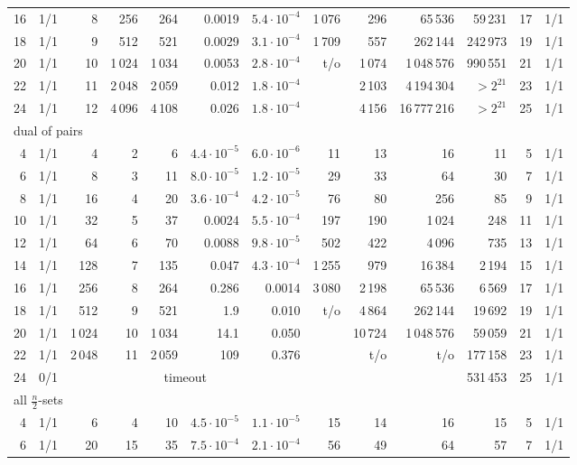\begin{table}[p]
\begin{tabular}{r r r r r r r r r r r r r}
16 & 1/1 & 8 & 256 & 264 & 0.0019 & $5.4{\cdot}10^{-4}$ & 1\,076 & 296 & 65\,536 & 59\,231 & 17 & 1/1\\
18 & 1/1 & 9 & 512 & 521 & 0.0029 & $3.1{\cdot}10^{-4}$ & 1\,709 & 557 & 262\,144 & 242\,973 & 19 & 1/1\\
20 & 1/1 & 10 & 1\,024 & 1\,034 & 0.0053 & $2.8{\cdot}10^{-4}$ & t/o & 1\,074 & 1\,048\,576 & 990\,551 & 21 & 1/1\\
22 & 1/1 & 11 & 2\,048 & 2\,059 & 0.012 & $1.8{\cdot}10^{-4}$ &  & 2\,103 & 4\,194\,304 & $>2^{21}$ & 23 & 1/1\\
24 & 1/1 & 12 & 4\,096 & 4\,108 & 0.026 & $1.8{\cdot}10^{-4}$ &  & 4\,156 & 16\,777\,216 & $>2^{21}$ & 25 & 1/1\\
\midrule
\multicolumn{13}{l}{dual of pairs}\\
4 & 1/1 & 4 & 2 & 6 & $4.4{\cdot}10^{-5}$ & $6.0{\cdot}10^{-6}$ & 11 & 13 & 16 & 11 & 5 & 1/1\\
6 & 1/1 & 8 & 3 & 11 & $8.0{\cdot}10^{-5}$ & $1.2{\cdot}10^{-5}$ & 29 & 33 & 64 & 30 & 7 & 1/1\\
8 & 1/1 & 16 & 4 & 20 & $3.6{\cdot}10^{-4}$ & $4.2{\cdot}10^{-5}$ & 76 & 80 & 256 & 85 & 9 & 1/1\\
10 & 1/1 & 32 & 5 & 37 & 0.0024 & $5.5{\cdot}10^{-4}$ & 197 & 190 & 1\,024 & 248 & 11 & 1/1\\
12 & 1/1 & 64 & 6 & 70 & 0.0088 & $9.8{\cdot}10^{-5}$ & 502 & 422 & 4\,096 & 735 & 13 & 1/1\\
14 & 1/1 & 128 & 7 & 135 & 0.047 & $4.3{\cdot}10^{-4}$ & 1\,255 & 979 & 16\,384 & 2\,194 & 15 & 1/1\\
16 & 1/1 & 256 & 8 & 264 & 0.286 & 0.0014 & 3\,080 & 2\,198 & 65\,536 & 6\,569 & 17 & 1/1\\
18 & 1/1 & 512 & 9 & 521 & 1.9 & 0.010 & t/o & 4\,864 & 262\,144 & 19\,692 & 19 & 1/1\\
20 & 1/1 & 1\,024 & 10 & 1\,034 & 14.1 & 0.050 &  & 10\,724 & 1\,048\,576 & 59\,059 & 21 & 1/1\\
22 & 1/1 & 2\,048 & 11 & 2\,059 & 109 & 0.376 &  & t/o & t/o & 177\,158 & 23 & 1/1\\
24 & 0/1 & \multicolumn{5}{c}{timeout} &  &  &  & 531\,453 & 25 & 1/1\\
\midrule
\multicolumn{13}{l}{all $\frac{n}{2}$-sets}\\
4 & 1/1 & 6 & 4 & 10 & $4.5{\cdot}10^{-5}$ & $1.1{\cdot}10^{-5}$ & 15 & 14 & 16 & 15 & 5 & 1/1\\
6 & 1/1 & 20 & 15 & 35 & $7.5{\cdot}10^{-4}$ & $2.1{\cdot}10^{-4}$ & 56 & 49 & 64 & 57 & 7 & 1/1\\

\end{tabular}
\end{table}
